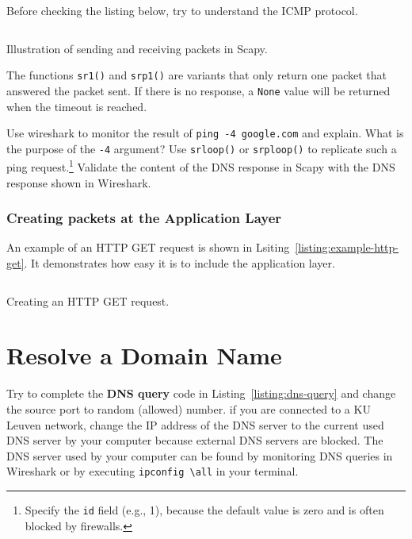 \documentclass[11pt,a4paper]{article}
\begin{document}
 \begin{info}
     Before checking the listing below, try to understand the ICMP protocol.
 \end{info}

\begin{listing}[h]
\inputminted{python}{../code_students/example_sr.py}
\caption{Illustration of sending and receiving packets in Scapy.}%
\label{listing:example-sr}
\end{listing}

 The functions \texttt{sr1()}  and \texttt{srp1()} are variants that only return one packet that answered the packet sent. If there is no response, a \texttt{None} value will be returned when the timeout is reached. 
 
 \begin{question}
     Use wireshark to monitor the result of \texttt{ping -4 google.com} and explain. What is the purpose of the \texttt{-4} argument? 
     Use \texttt{srloop()} or \texttt{srploop()} to replicate such a ping request.\footnote{Specify the \texttt{id} field (e.g., 1), because the default value is zero and is often blocked by firewalls. }
     Validate the content of the DNS response in Scapy with the DNS response shown in Wireshark.
 \end{question}
 
\subsubsection{Creating packets at the Application Layer}
An example of an HTTP GET request is shown in Lsiting~\ref{listing:example-http-get}. It demonstrates how easy it is to include the application layer. 

\begin{listing}[h]
\inputminted{python}{../code_students/example-http-get.py}
\caption{Creating an HTTP GET request.}%
\label{listing:example-http-get}
\end{listing}



\FloatBarrier
\section{Resolve a Domain Name}
Try to complete the \textbf{DNS query} code in Listing~\ref{listing:dns-query} and change the source port to random (allowed) number.
if you are connected to a KU Leuven network, change the IP address of the DNS server to the current used DNS server by your computer because external DNS servers are blocked. The DNS server used by your computer can be found by monitoring DNS queries in Wireshark or by executing \texttt{ipconfig \textbackslash all} in your terminal.
\end{document}
